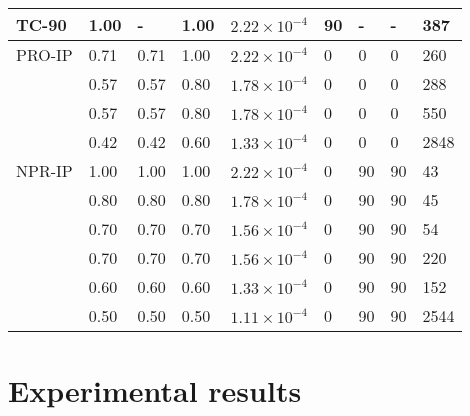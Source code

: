 \begin{table*}[htbp]
\begin{tabular}{p{2cm}p{1.2cm}p{1.2cm}p{1.2cm}p{2.5cm}p{1cm}p{1cm}p{1cm}p{1cm}}
    \hline
    TC-90 & 1.00  & -     & 1.00  & $2.22\times 10^{-4}$ & 90    & -     & -     & 387 \\
    \hline
    PRO-IP & 0.71  & 0.71  & 1.00  & $2.22\times 10^{-4}$ & 0     & 0     & 0     & 260 \\
          & 0.57  & 0.57  & 0.80  & $1.78\times 10^{-4}$ & 0     & 0     & 0     & 288 \\
          & 0.57  & 0.57  & 0.80  & $1.78\times 10^{-4}$ & 0     & 0     & 0     & 550 \\
          & 0.42  & 0.42  & 0.60  & $1.33\times 10^{-4}$ & 0     & 0     & 0     & 2848 \\
    \hline
    NPR-IP & 1.00  & 1.00  & 1.00  & $2.22\times 10^{-4}$ & 0     & 90    & 90    & 43 \\
          & 0.80  & 0.80  & 0.80  & $1.78\times 10^{-4}$ & 0     & 90    & 90    & 45 \\
          & 0.70  & 0.70  & 0.70  & $1.56\times 10^{-4}$ & 0     & 90    & 90    & 54 \\
          & 0.70  & 0.70  & 0.70  & $1.56\times 10^{-4}$ & 0     & 90    & 90    & 220 \\
          & 0.60  & 0.60  & 0.60  & $1.33\times 10^{-4}$ & 0     & 90    & 90    & 152 \\
          & 0.50  & 0.50  & 0.50  & $1.11\times 10^{-4}$ & 0     & 90    & 90    & 2544 \\
    \hline
    \end{tabular}%
  \label{Tab:TestMatrix}%
\end{table*}%

\section{Experimental results}
